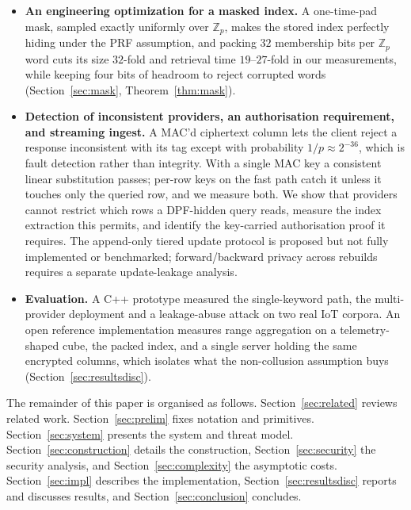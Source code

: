 \documentclass[a4paper,fleqn]{cas-sc}
\begin{document}
\begin{itemize}
\item \textbf{An engineering optimization for a masked index.} A one-time-pad mask, sampled exactly
uniformly over $\mathbb{Z}_p$, makes the stored index perfectly hiding under
the PRF assumption, and packing $32$ membership bits per $\mathbb{Z}_p$ word
cuts its size $32$-fold and retrieval time $19$--$27$-fold in our measurements,
while keeping four bits of
headroom to reject corrupted words (Section~\ref{sec:mask},
Theorem~\ref{thm:mask}).

\item \textbf{Detection of inconsistent providers, an authorisation
requirement, and streaming ingest.} A MAC'd ciphertext column lets the client
reject a response inconsistent with its tag except with probability
$1/p\approx2^{-36}$, which is fault detection rather than integrity. With a
single MAC key a consistent linear substitution passes; per-row keys on the
fast path catch it unless it touches only the queried row, and we measure
both. We show that providers cannot
restrict which rows a DPF-hidden query reads, measure the index extraction
this permits, and identify the key-carried authorisation proof it requires. The append-only tiered update protocol is proposed but
not fully implemented or benchmarked; forward/backward privacy across
rebuilds requires a separate update-leakage analysis.

\item \textbf{Evaluation.} A C++ prototype measured the single-keyword path,
the multi-provider deployment and a leakage-abuse attack on two real IoT
corpora. An open reference implementation measures range aggregation on a
telemetry-shaped cube, the packed index, and a single server holding the same
encrypted columns, which isolates what the non-collusion assumption buys
(Section~\ref{sec:resultsdisc}).
\end{itemize}

The remainder of this paper is organised as follows.
Section~\ref{sec:related} reviews related work. Section~\ref{sec:prelim} fixes
notation and primitives. Section~\ref{sec:system} presents the system and
threat model. Section~\ref{sec:construction} details
the construction, Section~\ref{sec:security} the security analysis, and
Section~\ref{sec:complexity} the asymptotic costs. Section~\ref{sec:impl}
describes the implementation, Section~\ref{sec:resultsdisc} reports and
discusses results, and Section~\ref{sec:conclusion} concludes.

\end{document}

